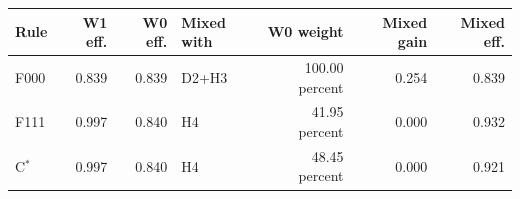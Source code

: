 \begin{tabular}{@{}lrrlrrr@{}}\toprule
Rule & W1 eff. & W0 eff. & Mixed with & W0 weight & Mixed gain & Mixed eff. \\\midrule
F000 & 0.839 & 0.839 & D2+H3 & 100.00 percent & 0.254 & 0.839 \\
F111 & 0.997 & 0.840 & H4 & 41.95 percent & 0.000 & 0.932 \\
C$^*$ & 0.997 & 0.840 & H4 & 48.45 percent & 0.000 & 0.921 \\
\bottomrule\end{tabular}

